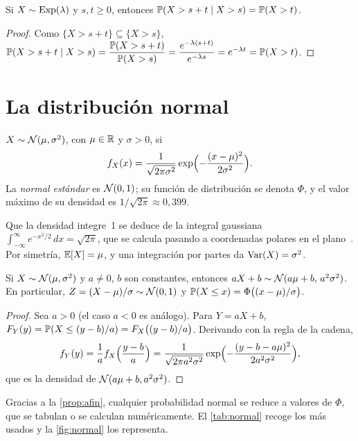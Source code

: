 \begin{proposicion}\label{prop:memoria}
Si $X\sim\operatorname{Exp}(\lambda)$ y $s,t\ge 0$, entonces $\mathbb{P}(X>s+t\mid X>s)=\mathbb{P}(X>t)$.
\end{proposicion}

\begin{proof}
Como $\{X>s+t\}\subseteq\{X>s\}$, $\mathbb{P}(X>s+t\mid X>s)=\dfrac{\mathbb{P}(X>s+t)}{\mathbb{P}(X>s)}=\dfrac{e^{-\lambda(s+t)}}{e^{-\lambda s}}=e^{-\lambda t}=\mathbb{P}(X>t)$.
\end{proof}

\section{La distribución normal}

\begin{definicion}[Normal]\label{def:normal}
$X\sim\mathcal{N}(\mu,\sigma^{2})$, con $\mu\in\mathbb{R}$ y $\sigma>0$, si
\[
f_X(x)=\frac{1}{\sqrt{2\pi\sigma^{2}}}\exp\Bigl(-\frac{(x-\mu)^{2}}{2\sigma^{2}}\Bigr).
\]
La \emph{normal estándar} es $\mathcal{N}(0,1)$; su función de distribución se denota $\Phi$, y el valor máximo de su densidad es $1/\sqrt{2\pi}\approx 0{,}399$.
\end{definicion}

Que la densidad integre~1 se deduce de la integral gaussiana $\int_{-\infty}^{\infty}e^{-x^{2}/2}\,dx=\sqrt{2\pi}$, que se calcula pasando a coordenadas polares en el plano~\cite[§3.3]{bt}. Por simetría, $\mathbb{E}[X]=\mu$, y una integración por partes da $\operatorname{Var}(X)=\sigma^{2}$.

\begin{proposicion}\label{prop:afin}
Si $X\sim\mathcal{N}(\mu,\sigma^{2})$ y $a\ne 0$, $b$ son constantes, entonces $aX+b\sim\mathcal{N}(a\mu+b,\,a^{2}\sigma^{2})$. En particular, $Z=(X-\mu)/\sigma\sim\mathcal{N}(0,1)$ y $\mathbb{P}(X\le x)=\Phi\bigl((x-\mu)/\sigma\bigr)$.
\end{proposicion}

\begin{proof}
Sea $a>0$ (el caso $a<0$ es análogo). Para $Y=aX+b$, $F_Y(y)=\mathbb{P}(X\le (y-b)/a)=F_X\bigl((y-b)/a\bigr)$. Derivando con la regla de la cadena,
\[
f_Y(y)=\frac1a f_X\Bigl(\frac{y-b}{a}\Bigr)=\frac{1}{\sqrt{2\pi a^{2}\sigma^{2}}}\exp\Bigl(-\frac{(y-b-a\mu)^{2}}{2a^{2}\sigma^{2}}\Bigr),
\]
que es la densidad de $\mathcal{N}(a\mu+b,a^{2}\sigma^{2})$.
\end{proof}

Gracias a la \cref{prop:afin}, cualquier probabilidad normal se reduce a valores de $\Phi$, que se tabulan o se calculan numéricamente. El \cref{tab:normal} recoge los más usados y la \cref{fig:normal} los representa.

